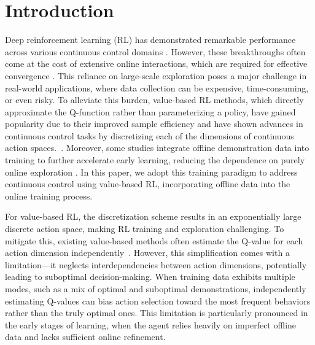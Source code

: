 \section{Introduction}
\label{sec:intro}


Deep reinforcement learning (RL) has demonstrated remarkable performance across various continuous control domains \cite{SAC, PPO}. However, these breakthroughs often come at the cost of extensive online interactions, which are required for effective convergence \cite{DotaFive, NatureDQN}. This reliance on large-scale exploration poses a major challenge in real-world applications, where data collection can be expensive, time-consuming, or even risky. To alleviate this burden, value-based RL methods, which directly approximate the Q-function rather than parameterizing a policy, have gained popularity due to their improved sample efficiency \cite{GQN, HGQN, DecQN} and have shown advances in continuous control tasks by discretizing each of the dimensions of continuous action spaces.~\cite{CQN}. Moreover, some studies integrate offline demonstration data into training to further accelerate early learning, reducing the dependence on purely online exploration \cite{RLPD}. In this paper, we adopt this training paradigm to address continuous control using value-based RL, incorporating offline data into the online training process.

For value-based RL, the discretization scheme results in an exponentially large discrete action space, making RL training and exploration challenging. To mitigate this, existing value-based methods often estimate the Q-value for each action dimension independently~\cite{SDQN, DecQN}. However, this simplification comes with a limitation—it neglects interdependencies between action dimensions, potentially leading to suboptimal decision-making. When training data exhibits multiple modes, such as a mix of optimal and suboptimal demonstrations, independently estimating Q-values can bias action selection toward the most frequent behaviors rather than the truly optimal ones.
This limitation is particularly pronounced in the early stages of learning, when the agent relies heavily on imperfect offline data and lacks sufficient online refinement.

